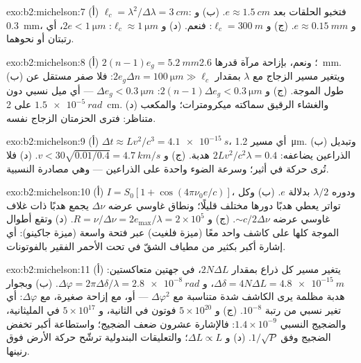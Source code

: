 \begin{solution}{exo:b2:michelson:7}
(أ) $\ell_c = \lambda^2/\Delta\lambda = \qty{3}{cm}$: فتخبو الحلقات بعد $e \approx \qty{1.5}{cm}$. (ب)
و \qty{0.3}{mm}، و $e \approx \qty{0.15}{mm}$. (ج) و $\ell_c = \qty{300}{m}$: فنعم. (د) و $\ell_c \approx \qty{1}{\micro m}$:
$2e < \qty{1}{\micro m}$، أي رتبتان أو نحوهما.
\end{solution}

\begin{solution}{exo:b2:michelson:8}
(أ) $2(n - 1)e_g = \qty{5.2}{mm}$؛ ونعم، بإزاحة مرآة قدرها \qty{2.6}{mm}. (ب) ويتغير
مسير الزجاج مع $\lambda$ بمقدار $2e_g\Delta n = \qty{100}{\micro m} \gg \ell_c$: فلا
صفر مستقل عن طول الموجة. (ج) و $2(n - 1)\Delta e_g < \qty{0.3}{\micro m}$: $\Delta e_g <
\qty{0.3}{\micro m}$ --- أي ميل نسبي دون $\qty{1.5e-5}{rad}$ على \qty{2}{cm}. (د) والغشاء
الرقيق سماكته ميكرومترات؛ والمكعب متناظر: فترى الحزمتان
الزجاج نفسه.
\end{solution}

\begin{solution}{exo:b2:michelson:9}
(أ) $\Delta t \approx Lv^2/c^3 = \qty{4.1e-15}{s}$، أي مسير \qty{1.2}{\micro m}. (ب) وتبديل
الذراعين يضاعفه: $2Lv^2/c^2\lambda = 0.4$ هدبة. (ج) و $v < 30\sqrt{0.01/0.4} =
\qty{4.7}{km/s}$. (د) فلا تُرى حركة في أثير؛ وسرعة الضوء
واحدة على الذراعين --- وهي مصادرة النسبية.
\end{solution}

\begin{solution}{exo:b2:michelson:10}
(أ) $I = S_0[1 + \cos(4\pi\nu_0e/c)]$، ودوره $\lambda/2$ بدلالة $e$. (ب) وكل تواتر
يعطي هدبًا دورها مختلف قليلًا؛ ونطاق غاوسي عرضه
$\Delta\nu$ يجمع هدبًا ذات غلاف غاوسي عرضه $\sim c/2\Delta\nu$.
(ج) و $R = \nu/\Delta\nu = 2e_{\max}/\lambda = 2 \times 10^5$. (د) وتقع أطوال الموجة كلها على
كاشف واحد معًا (ميزة فلغيت) عبر فتحة واسعة (ميزة جاكينو):
أي إشارة أكبر بكثير من مطياف الشقّ في تحت الأحمر
الفقير بالفوتونات.
\end{solution}

\begin{solution}{exo:b2:michelson:11}
(أ) يتغير مسير كل ذراع بمقدار $2N\Delta L$، في جهتين متعاكستين: $\Delta\delta = 4N\Delta L
= \qty{4.8e-15}{m}$، و $\Delta\varphi = 2\pi\Delta\delta/\lambda = \qty{2.8e-8}{rad}$. (ب) وبجوار هدبة
مظلمة يرى الكاشف شدة متناسبة مع $\Delta\varphi^2$ --- أو،
مع إزاحة صغيرة، مع $\Delta\varphi$: أي تغير نسبي من رتبة $10^{-8}$. (ج)
و $5 \times 10^{20}$ فوتون في الثانية، و $5 \times 10^{17}$ في المليثانية، والضجيج
النسبي $1.4 \times 10^{-9}$: فالإشارة عشرون ضعف الضجيج؛ واستطاعة أكبر
تخفض الضجيج وفق $1/\sqrt P$. (د) و $\Delta L \propto L$؛ والتعليقات البندولية
ترشّح حركة الأرض فوق رنينها.
\end{solution}

